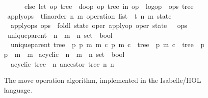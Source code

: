 \documentclass[sigconf]{acmart}
\renewcommand{\isacartoucheopen}{}
\renewcommand{\isacartoucheclose}{}
\begin{document}
\begin{figure}
\begin{isabellebody}
\ \ \ \ \ \ else\ let\ {\isacharparenleft}op{}{\isacharcomma}\ tree{}{\isacharparenright}\ {\isacharequal}\ do{\isacharunderscore}op\ {\isacharparenleft}op{}{\isacharcomma}\ tree{}{\isacharparenright}\ in\ {\isacharparenleft}op{}\ {\isacharhash}\ logop\ {\isacharhash}\ ops{\isacharcomma}\ tree{}{\isacharparenright}{\isacharparenright}{\isacartoucheclose}\isanewline
\isanewline
{}\isamarkupfalse%
\ apply{\isacharunderscore}ops\ {\isacharcolon}{\isacharcolon}\ {\isacartoucheopen}{\isacharparenleft}{\isacharprime}t{\isacharcolon}{\isacharcolon}{\isacharbraceleft}linorder{\isacharbraceright}{\isacharcomma}\ {\isacharprime}n{\isacharcomma}\ {\isacharprime}m{\isacharparenright}\ operation\ list\ {\isasymRightarrow}\ {\isacharparenleft}{\isacharprime}t{\isacharcomma}\ {\isacharprime}n{\isacharcomma}\ {\isacharprime}m{\isacharparenright}\ state{\isacartoucheclose}\ \isanewline
\ \ {\isacartoucheopen}apply{\isacharunderscore}ops\ ops\ {\isasymequiv}\ foldl\ {\isacharparenleft}{\isasymlambda}state\ oper{\isachardot}\ apply{\isacharunderscore}op\ oper\ state{\isacharparenright}\ {\isacharparenleft}{\isacharbrackleft}{\isacharbrackright}{\isacharcomma}\ {\isacharbraceleft}{\isacharbraceright}{\isacharparenright}\ ops{\isacartoucheclose}\isanewline
\isanewline
{}\isamarkupfalse%
\ unique{\isacharunderscore}parent\ {\isacharcolon}{\isacharcolon}\ {\isacartoucheopen}{\isacharparenleft}{\isacharprime}n\ {\isasymtimes}\ {\isacharprime}m\ {\isasymtimes}\ {\isacharprime}n{\isacharparenright}\ set\ {\isasymRightarrow}\ bool{\isacartoucheclose}\ \isanewline
\ \ {\isacartoucheopen}unique{\isacharunderscore}parent\ tree\ {\isasymequiv}\ {\isacharparenleft}{\isasymforall}p{}\ p{}\ m{}\ m{}\ c{\isachardot}\ {\isacharparenleft}p{}{\isacharcomma}\ m{}{\isacharcomma}\ c{\isacharparenright}\ {\isasymin}\ tree\ {\isasymand}\ {\isacharparenleft}p{}{\isacharcomma}\ m{}{\isacharcomma}\ c{\isacharparenright}\ {\isasymin}\ tree\ {\isasymlongrightarrow}\ p{}\ {\isacharequal}\ p{}\ {\isasymand}\ m{}\ {\isacharequal}\ m{}{\isacharparenright}{\isacartoucheclose}\isanewline%
\isanewline
{}\isamarkupfalse%
\ acyclic\ {\isacharcolon}{\isacharcolon}\ {\isacartoucheopen}{\isacharparenleft}{\isacharprime}n\ {\isasymtimes}\ {\isacharprime}m\ {\isasymtimes}\ {\isacharprime}n{\isacharparenright}\ set\ {\isasymRightarrow}\ bool{\isacartoucheclose}\ \isanewline
\ \ {\isacartoucheopen}acyclic\ tree\ {\isasymequiv}\ {\isacharparenleft}{\isasymnexists}n{\isachardot}\ ancestor\ tree\ n\ n{\isacharparenright}{\isacartoucheclose}
\end{isabellebody}
\caption{The move operation algorithm, implemented in the Isabelle/HOL language.}
\label{fig:code}
\end{figure}
\end{document}
